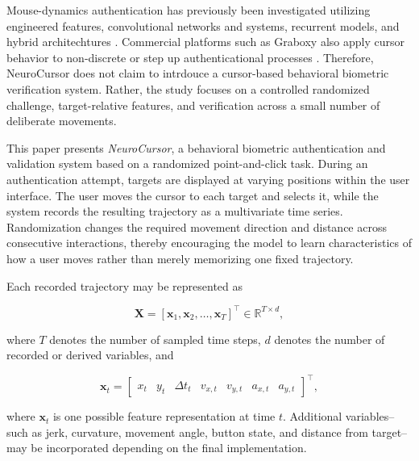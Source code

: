 \documentclass[conference]{IEEEtran}
\begin{document}
Mouse-dynamics authentication has previously been investigated utilizing engineered features, convolutional networks and systems, recurrent models, and hybrid architechtures \cite{antalFejer2020, wang2025Mouse}. Commercial platforms such as Graboxy also apply cursor behavior to non-discrete or step up authenticational processes \cite{graboxyContinuous}. Therefore, NeuroCursor does not claim to intrdouce a cursor-based behavioral biometric verification system. Rather, the study focuses on a controlled randomized challenge, target-relative features, and verification across a small number of deliberate movements.

This paper presents \textit{NeuroCursor}, a behavioral biometric authentication and validation system based on a randomized point-and-click task. During an authentication attempt, targets are displayed at varying positions within the user interface. The user moves the cursor to each target and selects it, while the system records the resulting trajectory as a multivariate time series. Randomization changes the required movement direction and distance across consecutive interactions, thereby encouraging the model to learn characteristics of how a user moves rather than merely memorizing one fixed trajectory. 

Each recorded trajectory may be represented as 

\begin{equation}
\mathbf{X}
=
\left[
\mathbf{x}_1,
\mathbf{x}_2,
\ldots,
\mathbf{x}_T
\right]^{\top}
\in
\mathbb{R}^{T \times d},
\label{eq:trajectory_matrix}
\end{equation}

where $T$ denotes the number of sampled time steps, $d$ denotes the number of recorded or derived variables, and 

\begin{equation}
\mathbf{x}_t = 
\begin{bmatrix}
x_t &
y_t &
\Delta t_t & 
v_{x,t} & 
v_{y,t} & 
a_{x,t} & 
a_{y,t}
\end{bmatrix}^{\top},
\label{eq:trajectory_vector}
\end{equation}

where $\mathbf{x}_t$ is one possible feature representation at time $t$. Additional variables--such as jerk, curvature, movement angle, button state, and distance from target--may be incorporated depending on the final implementation. 

\end{document}
